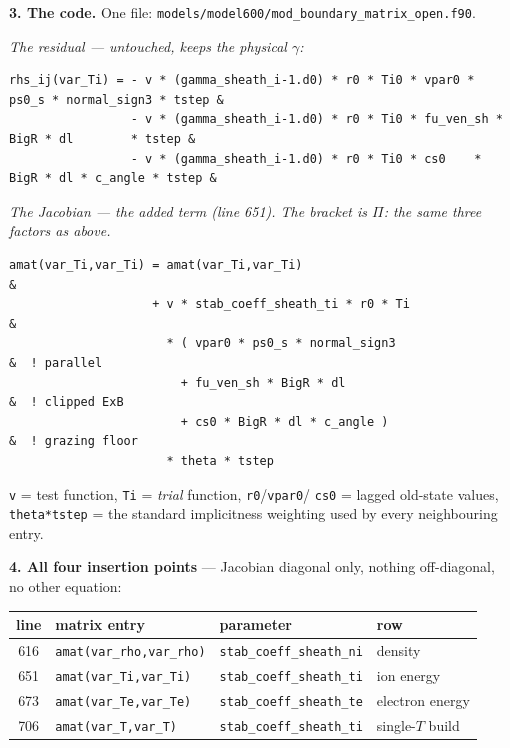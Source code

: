 \documentclass[11pt,a4paper]{article}
\newcommand{\code}[1]{\texttt{\small #1}}
\begin{document}
\vspace{7pt}
\textbf{3. The code.} One file: \code{models/model600/mod\_boundary\_matrix\_open.f90}.

\vspace{2pt}
{\small\textit{The residual --- untouched, keeps the physical $\gamma$:}}
\begin{lstlisting}
rhs_ij(var_Ti) = - v * (gamma_sheath_i-1.d0) * r0 * Ti0 * vpar0 * ps0_s * normal_sign3 * tstep &
                 - v * (gamma_sheath_i-1.d0) * r0 * Ti0 * fu_ven_sh * BigR * dl        * tstep &
                 - v * (gamma_sheath_i-1.d0) * r0 * Ti0 * cs0    * BigR * dl * c_angle * tstep &
\end{lstlisting}
{\small\textit{The Jacobian --- the added term (line 651). The bracket is $\Pi$: the same three
factors as above.}}
\begin{lstlisting}
amat(var_Ti,var_Ti) = amat(var_Ti,var_Ti)                                    &
                    + v * stab_coeff_sheath_ti * r0 * Ti                     &
                      * ( vpar0 * ps0_s * normal_sign3                       &  ! parallel
                        + fu_ven_sh * BigR * dl                              &  ! clipped ExB
                        + cs0 * BigR * dl * c_angle )                        &  ! grazing floor
                      * theta * tstep
\end{lstlisting}
\vspace{-2pt}
{\small \code{v} = test function, \code{Ti} = \emph{trial} function, \code{r0}/\code{vpar0}/%
\code{cs0} = lagged old-state values, \code{theta*tstep} = the standard implicitness weighting
used by every neighbouring entry.}

\vspace{5pt}
\textbf{4. All four insertion points} --- Jacobian diagonal only, nothing off-diagonal, no other
equation:
\begin{center}\small
\begin{tabular}{clll}
\toprule
line & matrix entry & parameter & row \\
\midrule
616 & \code{amat(var\_rho,var\_rho)} & \code{stab\_coeff\_sheath\_ni} & density \\
651 & \code{amat(var\_Ti,var\_Ti)}   & \code{stab\_coeff\_sheath\_ti} & ion energy \\
673 & \code{amat(var\_Te,var\_Te)}   & \code{stab\_coeff\_sheath\_te} & electron energy \\
706 & \code{amat(var\_T,var\_T)}     & \code{stab\_coeff\_sheath\_ti} & single-$T$ build \\
\bottomrule
\end{tabular}
\end{center}
\end{document}
